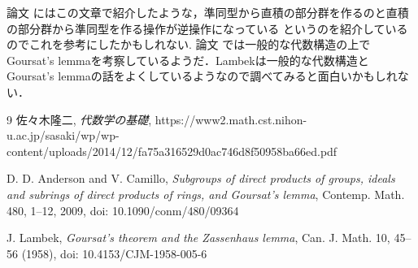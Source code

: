 \documentclass[leqno]{jsarticle}
\newtheorem{thm}{定理}
\begin{document}

論文
\cite{comtemporary}
にはこの文章で紹介したような，準同型から直積の部分群を作るのと直積の部分群から準同型を作る操作が逆操作になっている
というのを紹介しているのでこれを参考にしたかもしれない.
論文
\cite{lam}では一般的な代数構造の上でGoursat's lemmaを考察しているようだ．Lambekは一般的な代数構造とGoursat's lemmaの話をよくしているようなので調べてみると面白いかもしれない．
\begin{thebibliography}{9}
佐々木隆二, 
\textit{代数学の基礎}, 
https://www2.math.cst.nihon-u.ac.jp/sasaki/wp/wp-content/uploads/2014/12/fa75a316529d0ac746d8f50958ba66ed.pdf

D. D. Anderson and 
V. Camillo,
\textit{Subgroups of direct products of groups, ideals and subrings of direct products of rings, and Goursat’s lemma}, 
 Contemp. Math. 480, 1--12, 
 2009, 
 doi: 
10.1090/conm/480/09364


J. Lambek, 
\textit{Goursat’s theorem and the Zassenhaus lemma}, 
Can. J. Math. 10, 45--56 (1958), 
doi: 10.4153/CJM-1958-005-6

\end{thebibliography}




			
\end{document}
